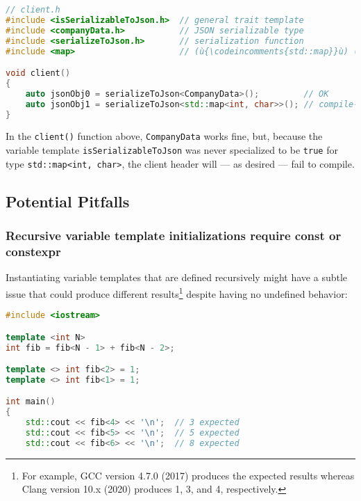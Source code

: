{\begin{lstlisting}[language=C++]
// client.h
#include <isSerializableToJson.h>  // general trait template
#include <companyData.h>           // JSON serializable type
#include <serializeToJson.h>       // serialization function
#include <map>                     // (ù{\codeincomments{std::map}}ù) (not JSON serializable)

void client()
{
    auto jsonObj0 = serializeToJson<CompanyData>();         // OK
    auto jsonObj1 = serializeToJson<std::map<int, char>>(); // compile-time error
}
\end{lstlisting}

\noindent In the \texttt{client()} function above, \texttt{CompanyData} works
fine, but, because the variable template \texttt{isSerializableToJson}
was never specialized to be \texttt{true} for type
\mbox{\texttt{std::map<int,} \texttt{char>}}, the client header will --- as
desired --- fail to compile.

\subsection[Potential Pitfalls]{Potential Pitfalls}\label{variabletemplate-potential-pitfalls}

\subsubsection[Recursive variable template initializations require {\tt const} or {\tt constexpr}]{Recursive variable template initializations require {\SubsubsecCode const} or {\SubsubsecCode constexpr}}\label{recursive-variable-template-initializations-require-const-or-constexpr}

Instantiating variable templates that are defined recursively might have a subtle issue that could produce different results{\cprotect\footnote{For
example, GCC version 4.7.0 (2017) produces the expected results whereas
  Clang version 10.x (2020) produces 1, 3, and 4, respectively.}} despite having no undefined behavior:

\begin{lstlisting}[language=C++]
#include <iostream>

template <int N>
int fib = fib<N - 1> + fib<N - 2>;

template <> int fib<2> = 1;
template <> int fib<1> = 1;

int main()
{
    std::cout << fib<4> << '\n';  // 3 expected
    std::cout << fib<5> << '\n';  // 5 expected
    std::cout << fib<6> << '\n';  // 8 expected


\end{lstlisting}}
